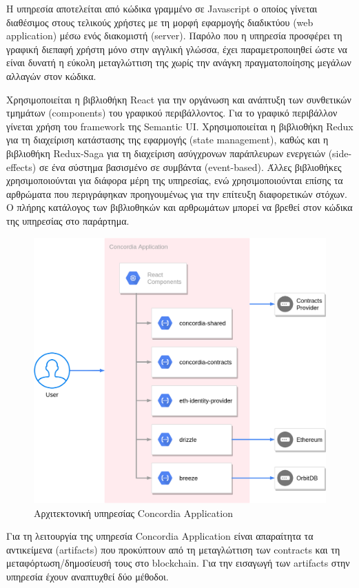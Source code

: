 Η υπηρεσία αποτελείται από κώδικα γραμμένο σε Javascript ο οποίος γίνεται διαθέσιμος στους τελικούς χρήστες με τη μορφή εφαρμογής διαδικτύου (web application) μέσω ενός διακομιστή (server). Παρόλο που η υπηρεσία προσφέρει τη γραφική διεπαφή χρήστη μόνο στην αγγλική γλώσσα, έχει παραμετροποιηθεί ώστε να είναι δυνατή η εύκολη μεταγλώττιση της χωρίς την ανάγκη πραγματοποίησης μεγάλων αλλαγών στον κώδικα.

Χρησιμοποιείται η βιβλιοθήκη React για την οργάνωση και ανάπτυξη των συνθετικών τμημάτων (components) του γραφικού περιβάλλοντος. Για το γραφικό περιβάλλον γίνεται χρήση του framework της Semantic UI. Χρησιμοποιείται η βιβλιοθήκη Redux για τη διαχείριση κατάστασης της εφαρμογής (state management), %
καθώς και η βιβλιοθήκη Redux-Saga για τη διαχείριση ασύγχρονων παράπλευρων ενεργειών (side-effects) σε ένα σύστημα βασισμένο σε συμβάντα (event-based). Άλλες βιβλιοθήκες χρησιμοποιούνται για διάφορα μέρη της υπηρεσίας, ενώ χρησιμοποιούνται επίσης τα αρθρώματα που περιγράφηκαν προηγουμένως για την επίτευξη διαφορετικών στόχων. Ο πλήρης κατάλογος των βιβλιοθηκών και αρθρωμάτων μπορεί να βρεθεί στον κώδικα της υπηρεσίας στο παράρτημα. %

\begin{figure}[H]
    \centering
    \includegraphics[width=.7\textwidth]{assets/figures/chapter-4/4.4.architecture-4.4.2.concordia-application-architecture.png}
    \caption{Αρχιτεκτονική υπηρεσίας Concordia Application}
    \label{figure:4-4-concordia-application-architecture}
\end{figure}

Για τη λειτουργία της υπηρεσία Concordia Application είναι απαραίτητα τα αντικείμενα (artifacts) που προκύπτουν από τη μεταγλώττιση των contracts και τη μεταφόρτωση/δημοσίευσή τους στο blockchain. Για την εισαγωγή των artifacts στην υπηρεσία έχουν αναπτυχθεί δύο μέθοδοι.

